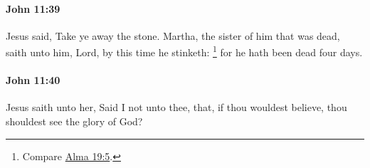 		\paragraph{John 11:39} %
			\label{JOHN-11-39}

			Jesus said, Take ye away the stone. Martha, the sister of him that was dead, saith unto him, Lord, by this time he stinketh:%
				\footnote{%
					Compare \hyperref[ALMA-19-5]{Alma 19:5}.
					}
			for he hath been dead four days.

			\begin{framed}
				\scriptsize
				\begin{compactdesc}
					\item[SBLG] 
				\end{compactdesc}
			\end{framed}

		\paragraph{John 11:40} %
			\label{JOHN-11-40}

			Jesus saith unto her, Said I not unto thee, that, if thou wouldest believe, thou shouldest see the glory of God?

